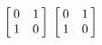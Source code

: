{$\left[\hskip -3pt \begin{array}{cc} 0&1\\  1&0\end {array} \hskip -3pt
 \right] $
 }
{$\left[\hskip -3pt \begin{array}{cc} 0&1\\  1&0\end {array} \hskip -3pt
 \right] $}
